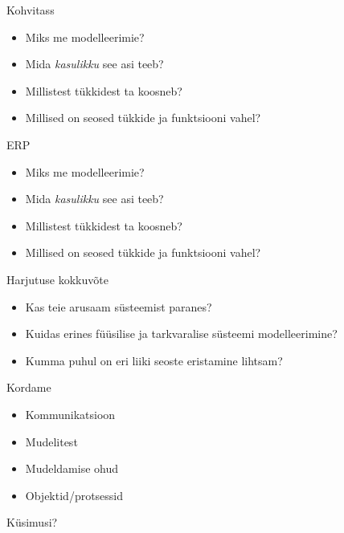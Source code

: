 \documentclass{beamer}
\begin{document}
\begin{frame}{Kohvitass}

\begin{itemize}
	\item Miks me modelleerimie?
	\item Mida \emph{kasulikku} see asi teeb?
	\item Millistest tükkidest ta koosneb?
	\item Millised on seosed tükkide ja funktsiooni vahel?
\end{itemize}

\end{frame}

\begin{frame}{ERP}

\begin{itemize}
	\item Miks me modelleerimie?
	\item Mida \emph{kasulikku} see asi teeb?
	\item Millistest tükkidest ta koosneb?
	\item Millised on seosed tükkide ja funktsiooni vahel?
\end{itemize}

\end{frame}


\begin{frame}{Harjutuse kokkuvõte}
	\begin{itemize}
		\item Kas teie arusaam süsteemist paranes?
		\item Kuidas erines füüsilise ja tarkvaralise süsteemi modelleerimine?
		\item Kumma puhul on eri liiki seoste eristamine lihtsam?
	\end{itemize}
\end{frame}

\begin{frame}{Kordame}
	\begin{itemize}
		\item Kommunikatsioon
		\item Mudelitest
		\item Mudeldamise ohud
		\item Objektid/protsessid
	\end{itemize}
\end{frame}


\begin{frame}[standout]
Küsimusi?
\end{frame}
\end{document}
